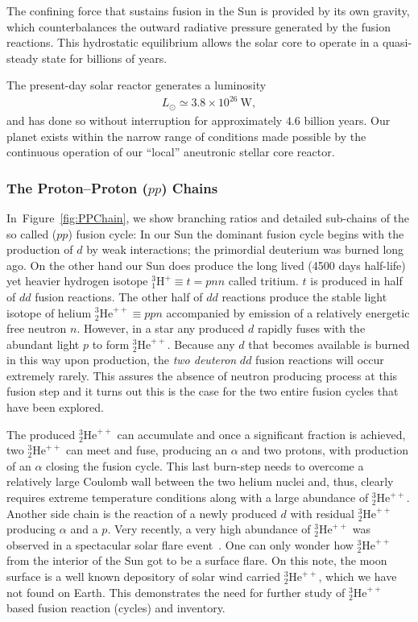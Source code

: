 \documentclass[particles,article,accept,pdftex,moreauthors]{Definitions/mdpi}
\newcommand{\rf}[1]{Figure~\ref{#1}}
\begin{document}
The confining force that sustains fusion in the Sun is provided by its own gravity, which counterbalances the outward radiative pressure generated by the fusion reactions. This hydrostatic equilibrium allows the solar core to operate in a quasi-steady state for billions of years.

The present-day solar reactor generates a luminosity
\begin{align}
L_\odot \simeq 3.8\times10^{26}~\mathrm{W},
\end{align}
and has done so without interruption for approximately $4.6$ billion years. Our planet exists within the narrow range of conditions made possible by the continuous operation of our ``local'' aneutronic stellar core reactor.

\subsubsection{The Proton--Proton (\texorpdfstring{$pp$}{pp}) Chains}\label{sec:PPChains}

In~\rf{fig:PPChain}, we show branching ratios and detailed sub-chains of the so called ($pp$) fusion cycle: 
In our Sun the dominant fusion cycle begins with the production of $d$ by weak interactions; the primordial deuterium was burned long ago. On the other hand our Sun does produce the long lived (4500 days half-life) yet heavier hydrogen isotope ${}^{3}_{1}\mathrm{H}^+\equiv t=pnn$ called tritium. $t$ is produced in half of $dd$ fusion reactions. The other half of $dd$ reactions produce the stable light isotope of helium ${}^{3}_{2}\mathrm{He}^{++}\equiv ppn$ accompanied by emission of a relatively energetic free neutron $n$. However, in a star any produced $d$ rapidly fuses with the abundant light $p$ to form ${}^{3}_{2}\mathrm{He}^{++}$. Because any $d$ that becomes available is burned in this way upon production, the {\em two deuteron} $dd$ fusion reactions will occur extremely rarely. This assures the absence of neutron producing process at this fusion step and it turns out this is the case for the two entire fusion cycles that have been explored.

The produced ${}^{3}_{2}\mathrm{He}^{++}$ can accumulate and once a significant fraction is achieved, two ${}^{3}_{2}\mathrm{He}^{++}$ can meet and fuse, producing an $\alpha$ and two protons, with production of an $\alpha$ closing the fusion cycle. This last burn-step needs to overcome a relatively large Coulomb wall between the two helium nuclei and, thus, clearly requires extreme temperature conditions along with a large abundance of ${}^{3}_{2}\mathrm{He}^{++}$. Another side chain is the reaction of a newly produced $d$ with residual ${}^{3}_{2}\mathrm{He}^{++}$ producing $\alpha$ and a $p$. Very recently, a very high abundance of ${}^{3}_{2}\mathrm{He}^{++}$ was observed in a spectacular solar flare event~\cite{Bucik:2025}. One can only wonder how ${}^{3}_{2}\mathrm{He}^{++}$ from the interior of the Sun got to be a surface flare. On this note, the moon surface is a well known depository of solar wind carried ${}^{3}_{2}\mathrm{He}^{++}$, which we have not found on Earth. This demonstrates the need for further study of ${}^{3}_{2}\mathrm{He}^{++}$ based fusion reaction (cycles) and inventory.
\end{document}
